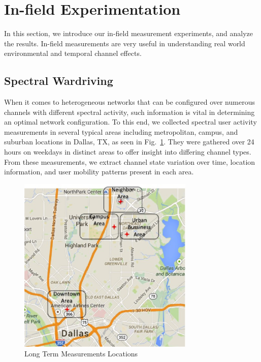 %

\section{In-field Experimentation}
\label{subsec:measurements}

In this section, we introduce our in-field measurement experiments, 
and analyze the results.
In-field measurements are very useful in understanding real world environmental and temporal channel effects. 


\subsection{Spectral Wardriving}
\label{subsec:spectrummeasurements}
When it comes to heterogeneous networks that can be configured over numerous channels with different spectral activity, such information is vital in determining an optimal network configuration. 
To this end, we collected spectral user activity measurements in several typical areas including metropolitan, campus, and suburban locations in Dallas, TX, as seen in Fig.~\ref{fig:measurement_map}. 
They were gathered over 24 hours on weekdays in distinct areas to offer insight into differing channel types. 
From these measurements, we extract channel state variation over time, location information, and user mobility patterns present in each area.

\begin{figure}
\vspace{-0.0in}
\centering
\includegraphics[width=84mm]{figures/measurements_map}
\vspace{-0.1in}
\caption{Long Term Measurements Locations}
\label{fig:measurement_map}
\vspace{-0.3in}
\end{figure}

